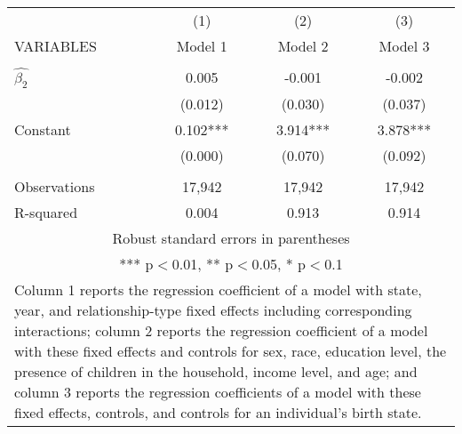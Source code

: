 \begin{tabular}{lccc}
\hline
 & (1) & (2) & (3) \\
VARIABLES & Model 1 & Model 2 & Model 3 \\ \hline
 &  &  &  \\
$\hat{\beta_2}$ & 0.005 & -0.001 & -0.002 \\
 & (0.012) & (0.030) & (0.037) \\
Constant & 0.102*** & 3.914*** & 3.878*** \\
 & (0.000) & (0.070) & (0.092) \\
 &  &  &  \\
Observations & 17,942 & 17,942 & 17,942 \\
 R-squared & 0.004 & 0.913 & 0.914 \\ \hline
\multicolumn{4}{c}{ Robust standard errors in parentheses} \\
\multicolumn{4}{c}{ *** p$<$0.01, ** p$<$0.05, * p$<$0.1} \\
\multicolumn{4}{p{0.8\linewidth}}{\small Column 1 reports the regression coefficient of a model with state, year, and relationship-type fixed effects including corresponding interactions; column 2 reports the regression coefficient of a model with these fixed effects and controls for sex, race, education level, the presence of children in the household, income level, and age; and column 3 reports the regression coefficients of a model with these fixed effects, controls, and controls for an individual’s birth state.} \\
\end{tabular}
